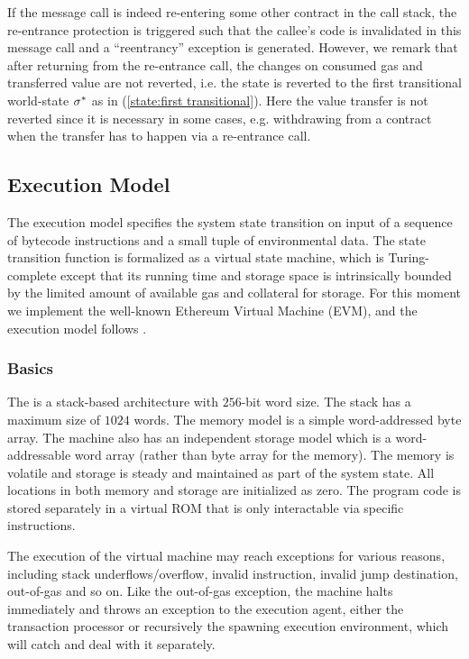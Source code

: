 If the message call is indeed re-entering some other contract in the call stack,
the re-entrance protection is triggered 
such that the callee's code is invalidated in this message call 
and a ``reentrancy'' exception is generated.
However, we remark that after returning from the re-entrance call,
the changes on consumed gas and transferred value are not reverted, i.e. the state is reverted to the first transitional world-state $\mathbf{\sigma}^{*}$ as in (\ref{state:first transitional}).
Here the value transfer is not reverted since it is necessary in some cases, 
e.g. withdrawing \cfx from a contract when the transfer has to happen via a re-entrance call.








\subsection{Execution Model}
\label{sec:exe model}

The execution model specifies the system state transition on input of a sequence of bytecode instructions and a small tuple of environmental data. 
The state transition function is formalized as a virtual state machine,
which 
is Turing-complete except that its running time and storage space is intrinsically bounded by the limited amount of available gas and collateral for storage.
% 
For this moment we implement the well-known Ethereum Virtual Machine (EVM), and the execution model follows \cite{ETH_yellow}.


\subsubsection{Basics}

The \cvm is a stack-based architecture with $256$-bit word size.
The stack has a maximum size of $1024$ words.
The memory model is a simple word-addressed byte array.  
The machine also has an independent storage model which is a word-addressable word array (rather than byte array for the memory). 
The memory is volatile and storage is steady and maintained as part of the system state. 
All locations in both memory and storage are initialized as zero.
The program code is stored separately in a virtual ROM that is only interactable via specific instructions.

The execution of the virtual machine may reach exceptions for various reasons, including stack underflows/overflow, invalid instruction, invalid jump destination, out-of-gas and so on.
Like the out-of-gas exception, the machine halts immediately and throws an exception to the execution agent, either the transaction processor or recursively the spawning execution environment, which will catch and deal with it separately. 



